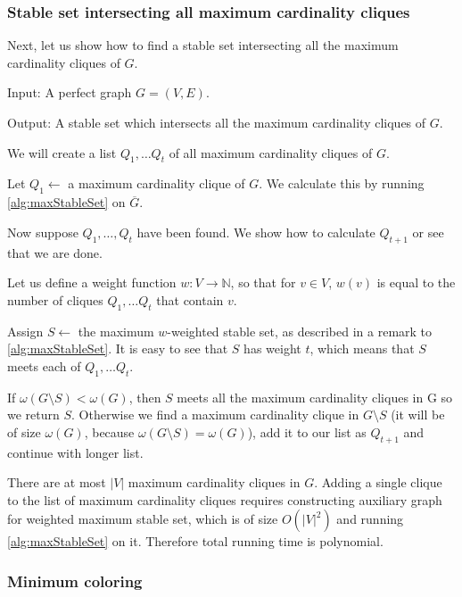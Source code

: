 \subsubsection{Stable set intersecting all maximum cardinality cliques}
Next, let us show how to find a stable set intersecting all the maximum cardinality cliques of $G$. 
\begin{alg}
  \label{alg:ssIntersectingCliques}
  Input: A perfect graph $G = (V, E)$.

  \noindent Output: A stable set which intersects all the maximum cardinality cliques of $G$.
\end{alg}
\begin{algtext}
  We will create a list $Q_1, \ldots Q_t$ of all maximum cardinality cliques of $G$.

  Let $Q_1 \leftarrow$ a maximum cardinality clique of $G$. We calculate this by running \cref{alg:maxStableSet} on $\overline{G}$.

  Now suppose $Q_1, \ldots, Q_t$ have been found. We show how to calculate $Q_{t+1}$ or see that we are done.

  Let us define a weight function $w : V \rightarrow \mathbb{N}$, so that for $v \in V$, $w(v)$ is equal to the number of cliques $Q_1, \ldots Q_t$ that contain $v$.

  Assign $S \leftarrow$ the maximum $w$-weighted stable set, as described in a remark to \cref{alg:maxStableSet}. It is easy to see that $S$ has weight $t$, which means that $S$ meets each of $Q_1, \ldots Q_t$.

  If $\omega(G \setminus S) < \omega(G)$, then $S$ meets all the maximum cardinality cliques in G so we return $S$. Otherwise we find a maximum cardinality clique in $G \setminus S$ (it will be of size $\omega(G)$, because $\omega(G \setminus S) = \omega(G)$), add it to our list as $Q_{t+1}$ and continue with longer list.

\end{algtext}

There are at most $|V|$ maximum cardinality cliques in $G$. Adding a single clique to the list of maximum cardinality cliques requires constructing auxiliary graph for weighted maximum stable set, which is of size $O(|V|^2)$ and running \cref{alg:maxStableSet} on it. Therefore total running time is polynomial.

\subsubsection{Minimum coloring}

